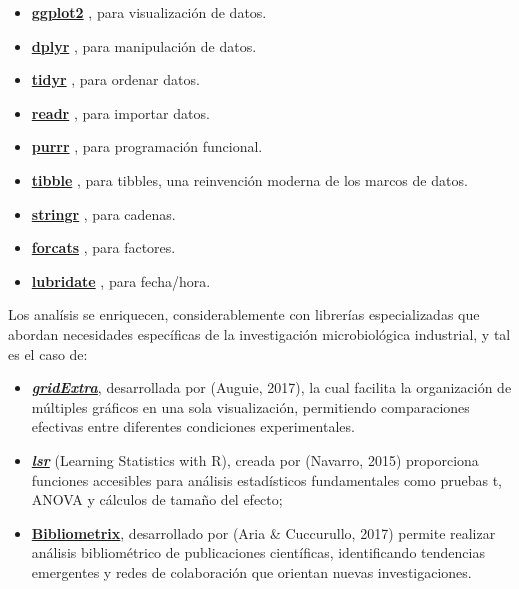 \documentclass[
  spanish,
  letterpaper,
  DIV=11,
  numbers=noendperiod]{scrreprt}
\begin{document}
\begin{itemize}
\item
  \href{https://ggplot2.tidyverse.org/}{\textbf{ggplot2}} , para
  visualización de datos.
\item
  \href{https://dplyr.tidyverse.org/}{\textbf{dplyr}} , para
  manipulación de datos.
\item
  \href{https://tidyr.tidyverse.org/}{\textbf{tidyr}} , para ordenar
  datos.
\item
  \href{https://readr.tidyverse.org/}{\textbf{readr}} , para importar
  datos.
\item
  \href{https://purrr.tidyverse.org/}{\textbf{purrr}} , para
  programación funcional.
\item
  \href{https://tibble.tidyverse.org/}{\textbf{tibble}} , para tibbles,
  una reinvención moderna de los marcos de datos.
\item
  \href{https://github.com/tidyverse/stringr}{\textbf{stringr}} , para
  cadenas.
\item
  \href{https://github.com/tidyverse/forcats}{\textbf{forcats}} , para
  factores.
\item
  \href{https://github.com/tidyverse/lubridate}{\textbf{lubridate}} ,
  para fecha/hora.
\end{itemize}

Los analísis se enriquecen, considerablemente con librerías
especializadas que abordan necesidades específicas de la investigación
microbiológica industrial, y tal es el caso de:

\begin{itemize}
\item
  \href{https://cran.r-project.org/web/packages/gridExtra/index.html}{\textbf{\emph{gridExtra}}},
  desarrollada por (Auguie, 2017), la cual facilita la organización de
  múltiples gráficos en una sola visualización, permitiendo
  comparaciones efectivas entre diferentes condiciones experimentales.
\item
  \href{https://cran.r-project.org/web/packages/lsr/index.html}{\textbf{\emph{lsr}}}
  (Learning Statistics with R), creada por (Navarro, 2015) proporciona
  funciones accesibles para análisis estadísticos fundamentales como
  pruebas t, ANOVA y cálculos de tamaño del efecto;
\item
  \href{https://www.bibliometrix.org/home/}{\textbf{Bibliometrix}},
  desarrollado por (Aria \& Cuccurullo, 2017) permite realizar análisis
  bibliométrico de publicaciones científicas, identificando tendencias
  emergentes y redes de colaboración que orientan nuevas
  investigaciones.
\end{itemize}
\end{document}
